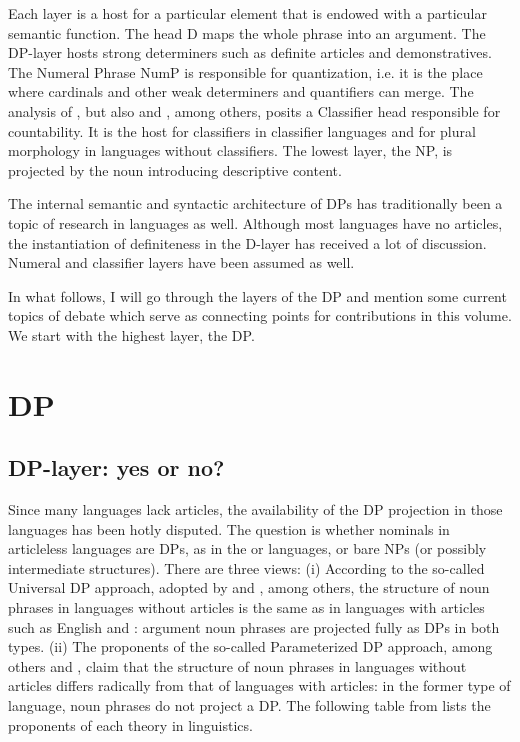 \documentclass[output=paper]{langscibook}
\begin{document}
Each layer is a host for a particular element that is endowed with a particular semantic function. The head D maps the whole phrase into an argument. The DP-layer hosts strong determiners such as definite articles and demonstratives. The Numeral Phrase NumP is responsible for quantization, i.e. it is the place where cardinals and other weak determiners and quantifiers can merge. The analysis of \cite{Borer2005}, but also \cite{Cheng.Heycock2017} and \cite{Cheng.Sybesma1999}, among others, posits a Classifier head responsible for countability. It is the host for classifiers in classifier languages and for plural morphology in languages without classifiers. The lowest layer, the NP, is projected by the noun introducing descriptive content.

The internal semantic and syntactic architecture of DPs has traditionally been a topic of research in  languages as well. Although most  languages have no articles, the instantiation of definiteness in the D-layer has received a lot of discussion. Numeral and classifier layers have been assumed as well.

In what follows, I will go through the layers of the DP and mention some current topics of debate which serve as connecting points for contributions in this volume. We start with the highest layer, the DP.

\section{DP}
\subsection{DP-layer: yes or no?}

Since many  languages lack articles, the availability of the DP projection in those languages has been hotly disputed. The question is whether nominals in articleless  languages are DPs, as in the  or  languages, or bare NPs (or possibly intermediate structures). There are three views: (i) According to the so-called Universal DP approach, adopted by \cite{Longobardi1994} and \cite{Matthewson1998}, among others, the structure of noun phrases in languages without articles is the same as in languages with articles such as English and : argument noun phrases are projected fully as DPs in both types. (ii) The proponents of the so-called Parameterized DP approach, among others \cite{Chierchia1998} and \cite{Baker2003}, claim that the structure of noun phrases in languages without articles differs radically from that of languages with articles: in the former type of language, noun phrases do not project a DP. The following table from \cite{Veselovska2014} lists the proponents of each theory in  linguistics.
\end{document}
